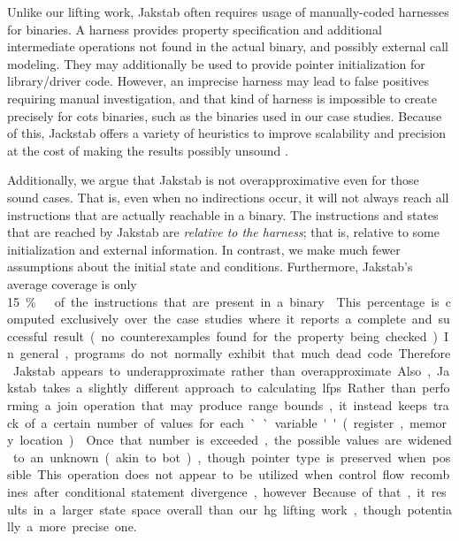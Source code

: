 Unlike our lifting work, Jakstab often requires usage of manually-coded harnesses for binaries.
A harness provides property specification and additional intermediate operations not found in the actual binary, and possibly external call modeling.
They may additionally be used to provide pointer initialization for library/driver code.
However, an imprecise harness may lead to false positives requiring manual investigation, and that kind of harness is impossible to create precisely for \ac{cots} binaries, such as the binaries used in our case studies.
Because of this, Jackstab offers a variety of heuristics to improve scalability and precision at the cost of making the results possibly unsound  \autocite[p.~129]{kinder2010static}.

Additionally, we argue that Jakstab is not overapproximative even for those sound cases.
That is, even when no indirections occur, it will not always reach all instructions that are actually reachable in a binary.
The instructions and states that are reached by Jakstab
are \emph{relative to the harness}; that is, relative to some initialization
and external information.
In contrast, we make much fewer assumptions about the initial state and conditions.
Furthermore, Jakstab's average coverage is only \SI{15}\percent\ of the instructions that are present in a binary \autocite[Table~6.2]{kinder2010static}.
This percentage is computed exclusively over the case studies where it reports a complete and successful result (no counterexamples found for the property being checked).
In general, programs do not normally exhibit that much dead code.
Therefore Jakstab appears to underapproximate rather than overapproximate.

Also, Jakstab takes a slightly different approach to calculating \acp{lfp}.
Rather than performing a join operation that may produce range bounds,
it instead keeps track of a certain number of values for each ``variable'' (register, memory location).
Once that number is exceeded, the possible values are widened to an unknown (akin to \gls{bot}), though pointer type is preserved when possible.
This operation does not appear to be utilized when control flow recombines
after conditional statement divergence, however.
Because of that, it results in a larger state space overall than our \ac{hg} lifting work, though potentially a more precise one.

